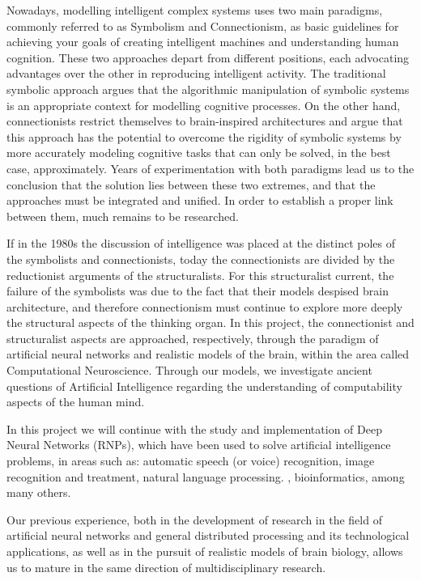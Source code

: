 Nowadays, modelling intelligent complex systems uses two main paradigms, commonly referred to as Symbolism and Connectionism, as basic guidelines for achieving your goals of creating intelligent machines and understanding human cognition. These two approaches depart from different positions, each advocating advantages over the other in reproducing intelligent activity. The traditional symbolic approach argues that the algorithmic manipulation of symbolic systems is an appropriate context for modelling cognitive processes. On the other hand, connectionists restrict themselves to brain-inspired architectures and argue that this approach has the potential to overcome the rigidity of symbolic systems by more accurately modeling cognitive tasks that can only be solved, in the best case, approximately. Years of experimentation with both paradigms lead us to the conclusion that the solution lies between these two extremes, and that the approaches must be integrated and unified. In order to establish a proper link between them, much remains to be researched.

If in the 1980s the discussion of intelligence was placed at the distinct poles of the symbolists and connectionists, today the connectionists are divided by the reductionist arguments of the structuralists. For this structuralist current, the failure of the symbolists was due to the fact that their models despised brain architecture, and therefore connectionism must continue to explore more deeply the structural aspects of the thinking organ. In this project, the connectionist and structuralist aspects are approached, respectively, through the paradigm of artificial neural networks and realistic models of the brain, within the area called Computational Neuroscience. Through our models, we investigate ancient questions of Artificial Intelligence regarding the understanding of computability aspects of the human mind.

In this project we will continue with the study and implementation of Deep Neural Networks (RNPs), which have been used to solve artificial intelligence problems, in areas such as: automatic speech (or voice) recognition, image recognition and treatment, natural language processing. , bioinformatics, among many others.

Our previous experience, both in the development of research in the field of artificial neural networks and general distributed processing and its technological applications, as well as in the pursuit of realistic models of brain biology, allows us to mature in the same direction of multidisciplinary research.
